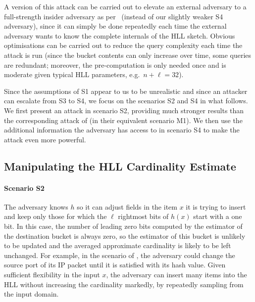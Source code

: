\documentclass{IEEEtran}
\begin{document}
A version of this attack can be carried out to elevate an external adversary to a full-strength insider adversary as per~\cite{cardestprivacy} (instead of our slightly weaker S4 adversary), since it can simply be done repeatedly each time the external adversary wants to know the complete internals of the HLL sketch. Obvious optimisations can be carried out to reduce the query complexity each time the attack is run (since the bucket contents can only increase over time, some queries are redundant; moreover, the pre-computation is only needed once and is moderate given typical HLL parameters, e.g.\ $n+\ell = 32$).

Since the assumptions of S1 appear to us to be unrealistic and since an attacker can escalate from S3 to S4, we focus on the scenarios S2 and S4 in what follows. We first present an attack in scenario S2, providing much stronger results than the corresponding attack of \cite{hllvuln} (in their equivalent scenario M1). We then use the additional information the adversary has access to in scenario S4 to make the attack even more powerful.

\subsection{Manipulating the HLL Cardinality Estimate}

\noindent\paragraph{Scenario S2} The adversary knows $h$ so it can adjust fields in the item $x$ it is trying to insert and keep only those for which the $\ell$ rightmost bits of $h(x)$ start with a one bit. In this case, the number of leading zero bits computed by the estimator of the destination bucket is always zero, so the estimator of this bucket is unlikely to be updated and the averaged approximate cardinality is likely to be left unchanged. For example, in the scenario of \cite{portscanhll}, the adversary could change the source port of its IP packet until it is satisfied with its hash value. Given sufficient flexibility in the input $x$, the adversary can insert many items into the HLL without increasing the cardinality markedly, by repeatedly sampling from the input domain.
\end{document}
